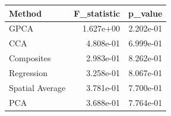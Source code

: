 \begin{tabular}{lrr}
\toprule
Method & F_statistic & p_value \\
\midrule
GPCA & 1.627e+00 & 2.202e-01 \\
CCA & 4.808e-01 & 6.999e-01 \\
Composites & 2.983e-01 & 8.262e-01 \\
Regression & 3.258e-01 & 8.067e-01 \\
Spatial Average & 3.781e-01 & 7.700e-01 \\
PCA & 3.688e-01 & 7.764e-01 \\
\bottomrule
\end{tabular}
